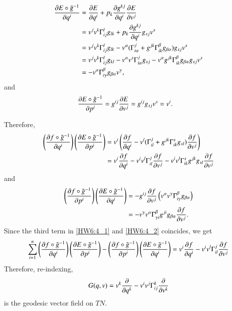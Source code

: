 \documentclass[a4paper, 12pt]{article}
\theoremstyle{Mydefinition}
\theoremstyle{Mytheorem}
\begin{document}
\begin{equation*}
    \begin{split}
         \pdv{E\circ \tilde{g}^{-1}}{q^i}&=\pdv{E}{q^i} + p_k\pdv{g^{kj}}{q^i}\pdv{E}{v^j}\\
         &=v^jv^k\Gamma_{ij}^l g_{lk} + p_k\pdv{g^{kj}}{q^i}g_{sj}v^s\\
         &=v^jv^k\Gamma_{ij}^l g_{lk} - v^\alpha(\Gamma_{i\alpha}^j + g^{jk}\Gamma_{ik}^\beta g_{\beta \alpha})g_{sj}v^s\\
         &=v^jv^k\Gamma_{ij}^l g_{kl} - v^\alpha v^s \Gamma_{i\alpha}^j g_{sj} - v^\alpha g^{jk}\Gamma_{ik}^\beta g_{\beta\alpha}g_{sj}v^s\\
         &=- v^\alpha \Gamma_{i\gamma}^\beta g_{\beta\alpha}v^\gamma,
    \end{split}
\end{equation*}
and
\begin{equation*}
    \begin{split}
         \pdv{E\circ \tilde{g}^{-1}}{p^i}&=g^{ij}\pdv{E}{v^j} = g^{ij}g_{sj}v^s = v^i.
    \end{split}
\end{equation*}

Therefore, 
\begin{equation}\label{HW6:4_1}
    \begin{split}
        \left(\pdv{f\circ \tilde{g}^{-1}}{q^i}\right)\left(\pdv{E\circ \tilde{g}^{-1}}{p^i}\right) &= v^i\left(\pdv{f}{q^i} - v^l(\Gamma_{il}^j + g^{jk}\Gamma_{ik}^sg_{sl})\pdv{f}{v^j}\right)\\
        &=v^i\pdv{f}{q^i} - v^iv^l\Gamma_{il}^j\pdv{f}{v^j} - v^iv^l\Gamma_{ik}^sg^{jk} g_{sl}\pdv{f}{v^j}
    \end{split}
\end{equation}
and
\begin{equation}\label{HW6:4_2}
\begin{split}
    \left(\pdv{f\circ \tilde{g}^{-1}}{p^i}\right)\left(\pdv{E\circ \tilde{g}^{-1}}{q^i}\right) &= -g^{ij}\pdv{f}{v^j}\left(v^\alpha v^\gamma\Gamma_{i\gamma}^\beta g_{\beta\alpha}\right)\\
    &=-v^\gamma v^\alpha  \Gamma_{\gamma i}^\beta g^{ji}g_{\beta\alpha}\pdv{f}{v^j}.
\end{split}
\end{equation}
Since the third term in \eqref{HW6:4_1} and \eqref{HW6:4_2} coincides, we get
\begin{equation*}
    \sum_{i=1}^n \left(\pdv{f\circ \tilde{g}^{-1}}{q^i}\right)\left(\pdv{E\circ \tilde{g}^{-1}}{p^i}\right) - \left(\pdv{f\circ \tilde{g}^{-1}}{p^i}\right)\left(\pdv{E\circ \tilde{g}^{-1}}{q^i}\right) = v^i\pdv{f}{q^i} - v^iv^l\Gamma_{il}^j\pdv{f}{v^j}
\end{equation*}
Therefore, re-indexing,
\begin{equation*}
G(q,v) = v^k\pdv{q^k} - v^iv^j\Gamma_{ij}^k\pdv{v^k}
\end{equation*}
is the geodesic vector field on $TN$.
\end{document}
